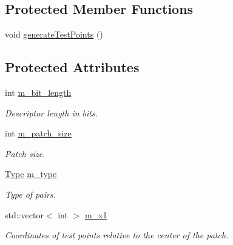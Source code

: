 \subsection*{Protected Member Functions}
\begin{DoxyCompactItemize}
\item 
void \hyperlink{classDVision_1_1BRIEF_a6daf52c01b9cbd845151077837870283}{generate\+Test\+Points} ()
\end{DoxyCompactItemize}
\subsection*{Protected Attributes}
\begin{DoxyCompactItemize}
\item 
\mbox{\label{classDVision_1_1BRIEF_ae49b641f3fd2f58928e1256627b4bb21}} 
int \hyperlink{classDVision_1_1BRIEF_ae49b641f3fd2f58928e1256627b4bb21}{m\+\_\+bit\+\_\+length}
\begin{DoxyCompactList}\small\item\em Descriptor length in bits. \end{DoxyCompactList}\item 
\mbox{\label{classDVision_1_1BRIEF_a73fca9548bbf58380cacedc73e4b5c0b}} 
int \hyperlink{classDVision_1_1BRIEF_a73fca9548bbf58380cacedc73e4b5c0b}{m\+\_\+patch\+\_\+size}
\begin{DoxyCompactList}\small\item\em Patch size. \end{DoxyCompactList}\item 
\mbox{\label{classDVision_1_1BRIEF_aaf2f0e2289b6924b32ecafb7b94bd9ff}} 
\hyperlink{classDVision_1_1BRIEF_a0203beaaafe3aca790393cc032eeb499}{Type} \hyperlink{classDVision_1_1BRIEF_aaf2f0e2289b6924b32ecafb7b94bd9ff}{m\+\_\+type}
\begin{DoxyCompactList}\small\item\em Type of pairs. \end{DoxyCompactList}\item 
\mbox{\label{classDVision_1_1BRIEF_a406548dc5cddec3b105d6ab35beadb40}} 
std\+::vector$<$ int $>$ \hyperlink{classDVision_1_1BRIEF_a406548dc5cddec3b105d6ab35beadb40}{m\+\_\+x1}
\begin{DoxyCompactList}\small\item\em Coordinates of test points relative to the center of the patch. \end{DoxyCompactList}\item 

\end{DoxyCompactItemize}
